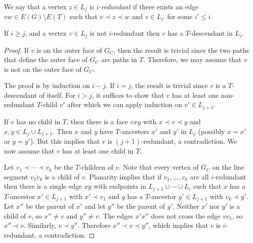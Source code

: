 \documentclass{patmorin}
\newcommand{\defin}[1]{\emph{\textcolor{brightmaroon}{#1}}}
\begin{document}
%


We say that a vertex $z\in L_j$ is \defin{$i$-redundant} if there exists an edge $vw\in E(G)\setminus E(T)$ such that $v\prec z\prec w$ and $v\in L_{i'}$ for some $i'\le i$.

\begin{clm}\label{has_descendant}
  If $i\ge j$, and a vertex $v\in L_j$ is not $i$-redundant then $v$ has a $T$-descendant in $L_i$.
\end{clm}

\begin{proof}
  If $v$ is on the outer face of $G_C$, then the result is trivial since the two paths that define the outer face of $G_C$ are paths in $T$.  Therefore, we may assume that $v$ is not on the outer face of $G_C$.

  The proof is by induction on $i-j$.
  If $i=j$, the result is trivial since $v$ is a $T$-descendant of itself. For $i>j$, it suffices to show that $v$ has at least one non-redundant $T$-child $v'$ after which we can apply induction on $v'\in L_{j+1}$.

  If $v$ has no child in $T$, then there is a face $vxy$ with $x\prec v\prec y$ and $x,y\in L_{j}\cup L_{j+1}$. Then $x$ and $y$ have $T$-ancestors $x'$ and $y'$ in $L_j$ (possibly $x=x'$ or $y=y'$). But this implies that $v$ is $(j+1)$-redundant, a contradiction. We now assume that $v$ has at least one child in $T$.

  Let $v_1\prec\cdots\prec v_k$ be the $T$-children of $v$.  Note that every vertex of $G_C$ on the line segment $\overline{v_1v_k}$ is a child of $v$.  Planarity implies that if $v_1,\ldots,v_k$ are all $i$-redundant then there is a single edge $xy$ with endpoints in $L_{j+1}\cup\cdots\cup L_i$ such that $x$ has a $T$-ancestor $x'\in L_{j+1}$ with $x'\prec v_1$ and $y$ has a $T$-ancestor $y'\in L_{j+1}$ with $v_k\prec y'$. Let $x''$ be the parent of $x'$ and let $y''$ be the parent of $y'$.  Neither $x'$ nor $y'$ is a child of $v$, so $x''\neq v$ and $y''\neq v$. The edges $x'x''$ does not cross the edge $vv_1$, so $x''\prec v$.  Similarly, $v\prec y''$.  Therefore $x''\prec v\prec y''$, which implies that $v$ is $i$-redundant, a contradiction.
\end{proof}
\end{document}
